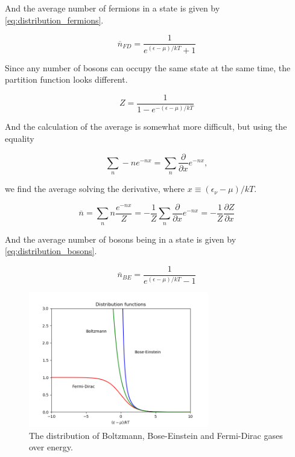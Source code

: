 And the average number of fermions in a state is given by \eqref{eq:distribution_fermions}.

\begin{equation} \label{eq:distribution_fermions}
\overline{n}_{FD} = \frac{1}{e^{(\epsilon - \mu)/kT} + 1}
\end{equation}

Since any number of bosons can occupy the same state at the same time, the partition function looks different. 

\begin{equation}
Z = \frac{1}{1 - e^{-(\epsilon - \mu)/kT}}
\end{equation}

And the calculation of the average is somewhat more difficult, but using the equality 

\begin{equation}
\sum_n -n e^{-nx} = \sum_n \frac{\partial}{\partial x} e^{-nx},
\end{equation}

we find the average solving the derivative, where $x \equiv (\epsilon_{\nu} - \mu)/kT$.

\begin{equation}
\overline{n} = \sum_n n \frac{e^{-nx}}{Z} = -\frac{1}{Z} \sum_n \frac{\partial}{\partial x} e^{-nx} = -\frac{1}{Z} \frac{\partial Z}{\partial x}
\end{equation}

And the average number of bosons being in a state is given by \eqref{eq:distribution_bosons}.

\begin{equation} \label{eq:distribution_bosons}
\overline{n}_{BE} = \frac{1}{e^{(\epsilon - \mu)/kT} - 1}
\end{equation}

\begin{figure} 
    \centering
    \includegraphics[width=0.7\textwidth]{images/distributions.png}
    \caption{The distribution of Boltzmann, Bose-Einstein and Fermi-Dirac gases over energy.}
    \label{fig:distribution_quantum_particles}
\end{figure} 

